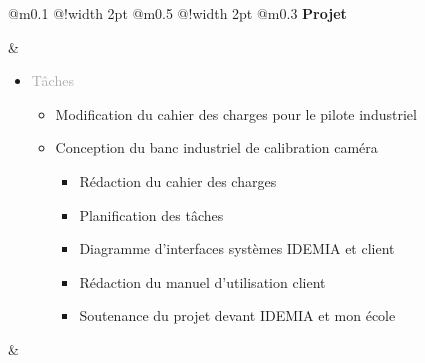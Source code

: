 \documentclass{article}
\begin{document}

\begin{tabular}
    {
        @{}m{}
        @{\hspace{0.001\textwidth}}!{\color{secondaryBlue}\vline width 2pt} %
        @{}m{0.5\textwidth}
        @{\hspace{0.025\textwidth}}!{\color{secondaryBlue}\vline width 2pt} %
        @{{\hspace{0.001\textwidth}}}m{0.3\textwidth}
    }
    \textcolor{secondaryBlue}
    {
        \textbf{Projet}
    } 

    &
    \begin{itemize}
        [label={}, topsep=8pt, partopsep=0pt, itemsep=0.5pt, parsep=2pt,after=\vspace*{-\baselineskip}]
        \setlength{\itemsep}{10pt}
        \item \textcolor{darkGray}{Tâches}
        \begin{itemize}
        [label={\textcolor{gray!80}{\checkmark}}, topsep=8pt, partopsep=0pt, itemsep=0.5pt, parsep=2pt, after=\vspace*{-\baselineskip}] 
            \item \textcolor{gray!80}{Modification du cahier des charges pour le pilote industriel}
            \item \textcolor{gray!80}{Conception du banc industriel de calibration caméra}
            \begin{itemize}
                [label={\textcolor{gray!80}{$\triangleright$}}, topsep=0pt, partopsep=0pt, itemsep=0.5pt, parsep=2pt]
                \item \textcolor{gray!80}{Rédaction du cahier des charges}
                \item \textcolor{gray!80}{Planification des tâches}
                \item \textcolor{gray!80}{Diagramme d'interfaces systèmes IDEMIA et client}
                \item \textcolor{gray!80}{Rédaction du manuel d'utilisation client}  
                \item \textcolor{gray!80}{Soutenance du projet devant IDEMIA et mon école}
            \end{itemize}
        \end{itemize}
    \end{itemize}
    &
    \begin{itemize}
        [label={}, topsep=8pt, partopsep=0pt, itemsep=0.5pt, parsep=2pt,after=\vspace*{-\baselineskip}]

\end{itemize}
\end{tabular}
\end{document}
